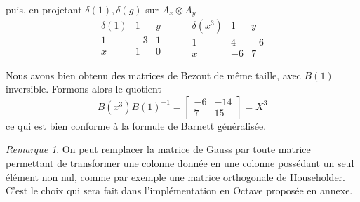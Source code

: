 \documentclass{article}
\theoremstyle{plain}%
\theoremstyle{definition}
\theoremstyle{remark}
\newtheorem*{rem}{Remarque}
\begin{document}
puis, en projetant $\delta(1), \delta(g)$ sur $A_x \otimes A_y$
$$
\begin{array}{c|cc}
	\delta(1) & 1 & y \\
	\hline
	1 & -3 & 1 \\
	x & 1 & 0 
\end{array}
\hspace{1cm}
\begin{array}{c|cc}
	\delta(x^3) & 1 & y \\
	\hline
	1 & 4 & -6  \\
	x & -6 & 7  
\end{array}
$$

Nous avons bien obtenu des matrices de Bezout de même taille, avec $B(1)$ inversible. Formons alors le quotient 
\begin{equation}
	B(x^3)B(1)^{-1} = 
	\begin{bmatrix}
		-6 & -14 \\
		7 & 15
	\end{bmatrix}
	= X^3
\end{equation}
ce qui est bien conforme à la formule de Barnett généralisée.

\begin{rem}
On peut remplacer la matrice de Gauss par toute matrice permettant de transformer une colonne donnée en une colonne possédant un seul élément non nul, comme par exemple une matrice orthogonale de Householder. C'est le choix qui sera fait dans l'implémentation en Octave proposée en annexe.

\end{rem}

\end{document}
